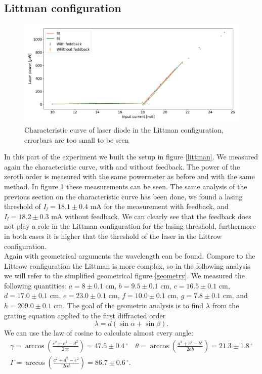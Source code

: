 \documentclass[a4paper,10pt]{article}
\begin{document}
\subsection{Littman configuration}
\begin{figure}[H]
\centering
\includegraphics[width=\textwidth]{curvelittman.png}
\caption{Characteristic curve of laser diode in the Littman configuration, errorbars are too small to be seen}\label{littmancurve}
\end{figure}
In this part of the experiment we built the setup in figure \ref{littman}. We measured again the characteristic curve, with and without feedback. The power of the zeroth order is measured with the same powermeter as before and with the same method. In figure \ref{littmancurve} these measurements can be seen. The same analysis of the previous section on the characteristic curve has been done, we found a lasing threshold of $I_l =18.1\pm 0.4$ mA for the measurement with feedback, and $I_l = 18.2 \pm 0.3$ mA without feedback. We can clearly see that the feedback does not play a role in the Littman configuration for the lasing threshold, furthermore in both cases it is higher that the threshold of the laser in the Littrow configuration.\\
Again with geometrical arguments the wavelength can be found. Compare to the Littrow configuration the Littman is more complex, so in the following analysis we will refer to the simplified geometrical figure \ref{geometry}. We measured the following quantities: $a = 8\pm0.1$ cm, $b= 9.5\pm 0.1$ cm, $c = 16.5\pm0.1$ cm, $d = 17.0\pm0.1$ cm, $e = 23.0\pm0.1$ cm, $f = 10.0\pm0.1$ cm, $g = 7.8\pm0.1$ cm, and $h = 209.0\pm0.1$ cm. The goal of the geometric analysis is to find $\lambda$ from the grating equation applied to the first diffracted order
\[\lambda = d(\sin\alpha + \sin\beta).\]
We can use the law of cosine to calculate almost every angle:
\begin{multline}\gamma = \arccos\left(\frac{c^2+e^2-d^2}{2ce}\right) = 47.5\pm0.4\,^\circ \quad  \theta = \arccos\left(\frac{a^2+c^2-b^2}{2ab}\right) = 21.3\pm 1.8\,^\circ \\ \Gamma = \arccos\left(\frac{c^2+d^2-e^2}{2cd}\right)=86.7\pm 0.6\,^\circ.\end{multline}
\end{document}
